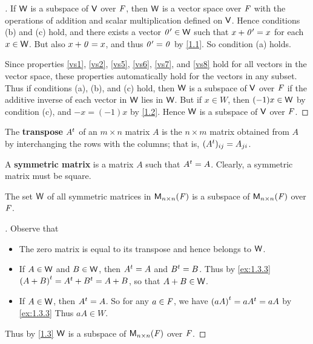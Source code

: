 \begin{proof}[]
	If \(\mathsf{W}\) is a subspace of \(\mathsf{V}\) over \(\mathit{F}\), then \(\mathsf{W}\) is a vector space over \(\mathit{F}\) with the operations of addition and scalar multiplication defined on \(\mathsf{V}\).
	Hence conditions (b) and (c) hold, and there exists a vector \(\mathit{0}' \in \mathsf{W}\) such that \(x + \mathit{0}' = x\) for each \(x \in \mathsf{W}\).
	But also \(x + \mathit{0} = x\), and thus \(\mathit{0}' = \mathit{0}\) by \cref{1.1}.
	So condition (a) holds.

	Since properties \ref{vs1}, \ref{vs2}, \ref{vs5}, \ref{vs6}, \ref{vs7}, and \ref{vs8} hold for all vectors in the vector space, these properties automatically hold for the vectors in any subset.
	Thus if conditions (a), (b), and (c) hold, then \(\mathsf{W}\) is a subspace of \(\mathsf{V}\) over \(\mathit{F}\) if the additive inverse of each vector in \(\mathsf{W}\) lies in \(\mathsf{W}\).
	But if \(x \in W\), then \((-1) x \in \mathsf{W}\) by condition (c), and \(-x = (-1) x\) by \cref{1.2}.
	Hence \(\mathsf{W}\) is a subspace of \(\mathsf{V}\) over \(\mathit{F}\).
\end{proof}

\begin{defn}\label{1.3.3}
	The \textbf{transpose} \({A}^{t}\) of an \(m \times n\) matrix \(A\) is the \(n \times m\) matrix obtained from \(A\) by interchanging the rows with the columns;
	that is, \(({A}^{t})_{i j} = A_{j i}\).
\end{defn}

\begin{defn}\label{1.3.4}
	A \textbf{symmetric matrix} is a matrix \(A\) such that \({A}^{t} = A\).
	Clearly, a symmetric matrix must be square.
\end{defn}

\begin{eg}\label{1.3.5}
	The set \(\mathsf{W}\) of all symmetric matrices in \(\ms[n][n][\F]\) is a subspace of \(\ms[n][n][\F]\) over \(\mathit{F}\).
\end{eg}

\begin{proof}[]
	Observe that
	\begin{itemize}
		\item The zero matrix is equal to its transpose and hence belongs to \(\mathsf{W}\).
		\item If \(A \in \mathsf{W}\) and \(B \in \mathsf{W}\), then \({A}^{t} = A\) and \({B}^{t} = B\).
		      Thus by \cref{ex:1.3.3} \({(A + B)}^{t} = {A}^{t} + {B}^{t} = A + B\), so that \(A + B \in \mathsf{W}\).
		\item If \(A \in \mathsf{W}\), then \({A}^{t} = A\).
		      So for any \(a \in \mathit{F}\), we have \({(aA)}^{t} = a{A}^{t} = aA\) by \cref{ex:1.3.3}
		      Thus \(aA \in W\).
	\end{itemize}
	Thus by \cref{1.3} \(\mathsf{W}\) is a subspace of \(\ms[n][n][\F]\) over \(\mathit{F}\).
\end{proof}

